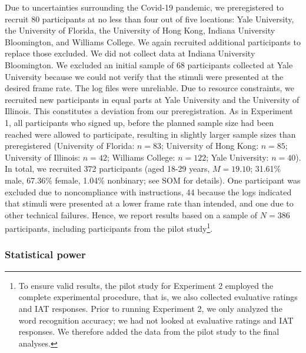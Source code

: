 \documentclass[
  man,floatsintext]{apa6}
\begin{document}
Due to uncertainties surrounding the Covid-19 pandemic, we preregistered to recruit 80 participants at no less than four out of five locations: Yale University, the University of Florida, the University of Hong Kong, Indiana University Bloomington, and Williams College.
We again recruited additional participants to replace those excluded.
We did not collect data at Indiana University Bloomington.
We excluded an initial sample of 68 participants collected at Yale University because we could not verify that the stimuli were presented at the desired frame rate.
The log files were unreliable.
Due to resource constraints, we recruited new participants in equal parts at Yale University and the University of Illinois.
This constitutes a deviation from our preregistration.
As in Experiment 1, all participants who signed up, before the planned sample size had been reached were allowed to participate, resulting in slightly larger sample sizes than preregistered (University of Florida: \(n = 83\); University of Hong Kong: \(n = 85\); University of Illinois: \(n = 42\); Williams College: \(n = 122\); Yale University: \(n = 40\)).
In total, we recruited 372 participants (aged 18-29 years, \(M = 19.10\); 31.61\% male, 67.36\% female, 1.04\% nonbinary; see SOM for details).
One participant was excluded due to noncompliance with instructions, 44 because the logs indicated that stimuli were presented at a lower frame rate than intended, and one due to other technical failures.
Hence, we report results based on a sample of \(N = 386\) participants, including participants from the pilot study\footnote{To ensure valid results, the pilot study for Experiment 2 employed the complete experimental procedure, that is, we also collected evaluative ratings and IAT responses. Prior to running Experiment 2, we only analyzed the word recognition accuracy; we had not looked at evaluative ratings and IAT responses. We therefore added the data from the pilot study to the final analyses.}.

\hypertarget{statistical-power-1}{%
\subsubsection{Statistical power}\label{statistical-power-1}}
\end{document}
